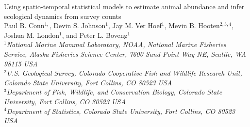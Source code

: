 \documentclass[12pt,english]{article}
\begin{document}
\begin{spacing}{1.9}


\begin{center}
Using spatio-temporal statistical models to estimate animal abundance and infer ecological dynamics from survey counts
\bigskip\\
\normalsize
{\sc Paul B. Conn$^{1,}$\footnotemark[2],
Devin S. Johnson$^1$, Jay M. Ver Hoef$^{1}$, Mevin B. Hooten$^{2,3,4}$, Joshua M. London$^1$, and Peter L. Boveng$^1$}\smallskip\\
$^1${\em National Marine Mammal Laboratory, NOAA, National Marine Fisheries Service,
Alaska Fisheries Science Center, 7600 Sand Point Way NE, Seattle,
WA 98115 USA }\\ \medskip
$^2${\em U.S. Geological Survey, Colorado Cooperative Fish and Wildlife Research Unit, Colorado State University, Fort Collins, CO 80523 USA }\\ \medskip
$^3${\em Department of Fish, Wildlife, and Conservation Biology, Colorado State University, Fort Collins, CO 80523 USA }\\ \medskip
$^4${\em Department of Statistics, Colorado State University, Fort Collins, CO 80523 USA }\\ \medskip
\end{center}


\raggedright \setlength{\parindent}{0.3in}
{}

\linenumbers


\end{spacing}
\end{document}
